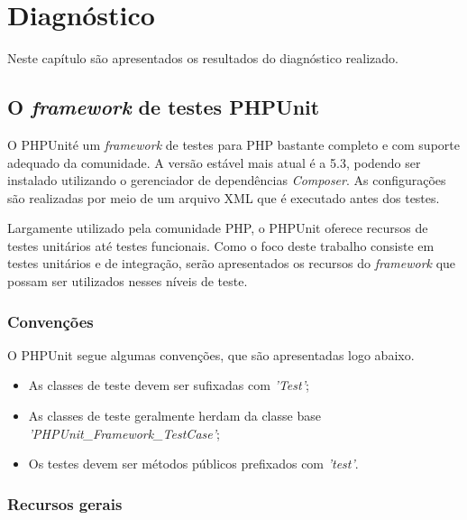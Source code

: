 \chapter{Diagnóstico}

Neste capítulo são apresentados os resultados do diagnóstico realizado.

\section{O \textit{framework} de testes PHPUnit}

  O PHPUnit\footnotemark  é um \textit{framework} de testes para PHP bastante completo e com suporte adequado
  da comunidade. A versão estável mais atual é a 5.3, podendo ser instalado utilizando o gerenciador
  de dependências \textit{Composer}. As configurações são realizadas por meio de um arquivo XML que é 
  executado antes dos testes.
  
  Largamente utilizado pela comunidade PHP, o PHPUnit oferece recursos de testes unitários até
  testes funcionais. Como o foco deste trabalho consiste em testes unitários e de integração, serão
  apresentados os recursos do \textit{framework} que possam ser utilizados nesses níveis de teste.
  
  \subsection{Convenções}
    
    O PHPUnit segue algumas convenções, que são apresentadas logo abaixo.
    
    \begin{itemize}
      \item As classes de teste devem ser sufixadas com \textit{'Test'};
      
      \item As classes de teste geralmente herdam da classe base \textit{'PHPUnit\_Framework\_TestCase'};
      
      \item Os testes devem ser métodos públicos prefixados com \textit{'test'}.
    \end{itemize}

  
  \subsection{Recursos gerais}
  
